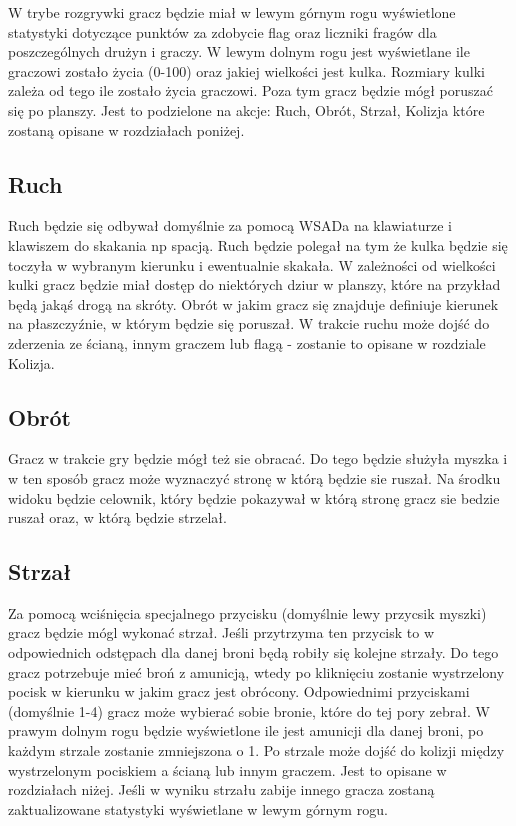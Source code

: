 \documentclass[12pt,a4paper,twoside]{article}
\begin{document}
W trybe rozgrywki gracz będzie miał w lewym górnym rogu wyświetlone statystyki dotyczące punktów za zdobycie flag oraz liczniki fragów dla poszczególnych drużyn i graczy. W lewym dolnym rogu jest wyświetlane ile graczowi zostało życia (0-100) oraz jakiej wielkości jest kulka. Rozmiary kulki zależa od tego ile zostało życia graczowi. Poza tym gracz będzie mógł poruszać się po planszy. Jest to podzielone na akcje: Ruch, Obrót, Strzał, Kolizja które zostaną opisane w rozdziałach poniżej.

\subsection{Ruch}
Ruch będzie się odbywał domyślnie za pomocą WSADa na klawiaturze i klawiszem do skakania np spacją. Ruch będzie polegał na tym że kulka będzie się toczyła w wybranym kierunku i ewentualnie skakała. W zależności od wielkości kulki gracz będzie miał dostęp do niektórych dziur w planszy, które na przykład będą jakąś drogą na skróty. Obrót w jakim gracz się znajduje definiuje kierunek na płaszczyźnie, w którym będzie się poruszał. W trakcie ruchu może dojść do zderzenia ze ścianą, innym graczem lub flagą - zostanie to opisane w rozdziale Kolizja.

\subsection{Obrót}
Gracz w trakcie gry będzie mógł też sie obracać. Do tego będzie służyła myszka i w ten sposób gracz może wyznaczyć stronę w którą będzie sie ruszał. Na środku widoku będzie celownik, który będzie pokazywał w którą stronę gracz sie bedzie ruszał oraz, w którą będzie strzelał.

\subsection{Strzał}
Za pomocą wciśnięcia specjalnego przycisku (domyślnie lewy przycsik myszki) gracz będzie mógl wykonać strzał. Jeśli przytrzyma ten przycisk to w odpowiednich odstępach dla danej broni będą robiły się kolejne strzały. Do tego gracz potrzebuje mieć broń z amunicją, wtedy po kliknięciu zostanie wystrzelony pocisk w kierunku w jakim gracz jest obrócony. Odpowiednimi przyciskami (domyślnie 1-4) gracz może wybierać sobie bronie, które do tej pory zebrał. W prawym dolnym rogu będzie wyświetlone ile jest amunicji dla danej broni, po każdym strzale zostanie zmniejszona o 1. Po strzale może dojść do kolizji między wystrzelonym pociskiem a ścianą lub innym graczem. Jest to opisane w rozdziałach niżej. Jeśli w wyniku strzału zabije innego gracza zostaną zaktualizowane statystyki wyświetlane w lewym górnym rogu.
\end{document}
